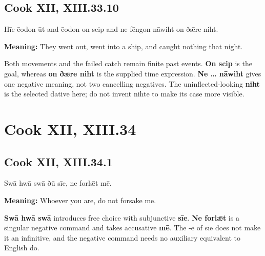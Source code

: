 \par\begin{minipage}{\linewidth}\raggedright
\subsection*{Cook XII, XIII.33.10}

Hīe ēodon ūt and ēodon on scip and ne fēngon nāwiht on ðǣre niht.

\textbf{Meaning:} They went out, went into a ship, and caught nothing that night.

Both movements and the failed catch remain finite past events. \textbf{On scip} is the goal, whereas \textbf{on ðǣre niht} is the supplied time expression. \textbf{Ne … nāwiht} gives one negative meaning, not two cancelling negatives. The uninflected-looking \textbf{niht} is the selected dative here; do not invent nihte to make its case more visible.

\end{minipage}\par\addvspace{4pt}

\clearpage
\section*{Cook XII, XIII.34}

\par\begin{minipage}{\linewidth}\raggedright
\subsection*{Cook XII, XIII.34.1}

Swā hwā swā ðū sīe, ne forlǣt mē.

\textbf{Meaning:} Whoever you are, do not forsake me.

\textbf{Swā hwā swā} introduces free choice with subjunctive \textbf{sīe}. \textbf{Ne forlǣt} is a singular negative command and takes accusative \textbf{mē}. The -e of sīe does not make it an infinitive, and the negative command needs no auxiliary equivalent to English do.

\end{minipage}\par\addvspace{4pt}

